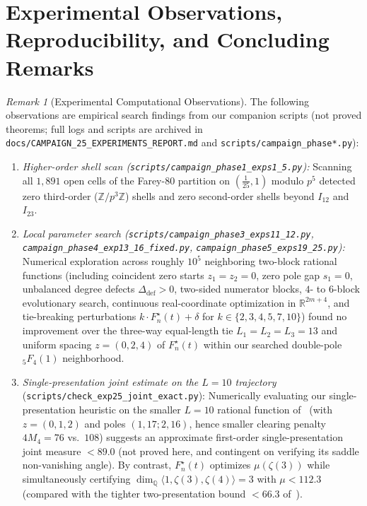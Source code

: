 \documentclass[11pt,reqno]{amsart}
\theoremstyle{definition}
\theoremstyle{remark}
\newtheorem{remark}[theorem]{Remark}
\newcommand{\QQ}{\mathbb{Q}}
\newcommand{\ZZ}{\mathbb{Z}}
\newcommand{\RR}{\mathbb{R}}
\begin{document}
\section{Experimental Observations, Reproducibility, and Concluding Remarks}
\label{sec:remarks}

\begin{remark}[Experimental Computational Observations]
\label{rem:optimality}
The following observations are empirical search findings from our companion scripts (not proved theorems; full logs and scripts are archived in \texttt{docs/\allowbreak CAMPAIGN\_25\_\allowbreak EXPERIMENTS\_\allowbreak REPORT.md} and \texttt{scripts/\allowbreak campaign\_\allowbreak phase*.py}):
\begin{enumerate}
  \item \emph{Higher-order shell scan (\texttt{scripts/\allowbreak campaign\_\allowbreak phase1\_\allowbreak exps1\_5.py}):} Scanning all $1{,}891$ open cells of the Farey-$80$ partition on $(\frac{1}{25}, 1)$ modulo $p^5$ detected zero third-order ($\ZZ/p^3\ZZ$) shells and zero second-order shells beyond $I_{12}$ and $I_{23}$.
  \item \emph{Local parameter search (\texttt{scripts/\allowbreak campaign\_\allowbreak phase3\_\allowbreak exps11\_12.py}, \texttt{campaign\_\allowbreak phase4\_\allowbreak exp13\_16\_\allowbreak fixed.py}, \texttt{campaign\_\allowbreak phase5\_\allowbreak exps19\_25.py}):} Numerical exploration across roughly $10^5$ neighboring two-block rational functions (including coincident zero starts $z_1 = z_2 = 0$, zero pole gap $s_1 = 0$, unbalanced degree defects $\Delta_{\mathrm{def}} > 0$, two-sided numerator blocks, $4$- to $6$-block evolutionary search, continuous real-coordinate optimization in $\RR^{2m+4}$, and tie-breaking perturbations $k\cdot F_n^{\star}(t) + \delta$ for $k \in \{2, 3, 4, 5, 7, 10\}$) found no improvement over the three-way equal-length tie $L_1 = L_2 = L_3 = 13$ and uniform spacing $z = (0, 2, 4)$ of $F_n^{\star}(t)$ within our searched double-pole ${}_5F_4(1)$ neighborhood.
  \item \emph{Single-presentation joint estimate on the $L = 10$ trajectory} (\texttt{scripts/\allowbreak check\_\allowbreak exp25\_\allowbreak joint\_\allowbreak exact.py}): Numerically evaluating our single-presentation heuristic on the smaller $L = 10$ rational function of~\cite{LeibtagKaminer2026} (with $z = (0, 1, 2)$ and poles $(1, 17;\allowbreak 2, 16)$, hence smaller clearing penalty $4M_4 = 76$ vs.\ $108$) suggests an approximate first-order single-presentation joint measure $< 89.0$ (not proved here, and contingent on verifying its saddle non-vanishing angle). By contrast, $F_n^{\star}(t)$ optimizes $\mu(\zeta(3))$ while simultaneously certifying $\dim_{\QQ}\langle 1,\allowbreak \zeta(3),\allowbreak \zeta(4)\rangle = 3$ with $\mu < 112.3$ (compared with the tighter two-presentation bound $< 66.3$ of~\cite{LeibtagKaminer2026}).
\end{enumerate}
\end{remark}
\end{document}
